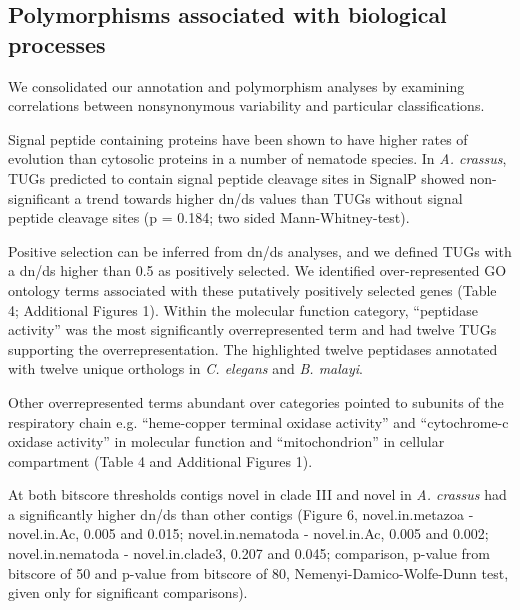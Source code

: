 \documentclass[10pt]{bmc_article}
\newenvironment{bmcformat}{\begin{raggedright}\baselineskip20pt\sloppy\setboolean{publ}{false}}{\end{raggedright}\baselineskip20pt\sloppy}
\begin{document}
\begin{bmcformat}
\subsection*{Polymorphisms associated with biological processes}

We consolidated our annotation and polymorphism analyses by examining
correlations between nonsynonymous variability and particular
classifications.

Signal peptide containing proteins have been shown to have higher
rates of evolution than cytosolic proteins in a number of nematode
species. In \textit{A. crassus}, TUGs predicted to contain signal
peptide cleavage sites in SignalP showed non-significant a trend
towards higher dn/ds values than TUGs without signal peptide cleavage
sites (p = 0.184; two sided
Mann-Whitney-test).

Positive selection can be inferred from dn/ds analyses, and we defined
TUGs with a dn/ds higher than 0.5 as positively selected. We
identified over-represented GO ontology terms associated with these
putatively positively selected genes (Table 4; Additional Figures
1). Within the molecular function category, ``peptidase activity'' was
the most significantly overrepresented term and had twelve TUGs
supporting the overrepresentation. The highlighted twelve peptidases
annotated with twelve unique orthologs in \textit{C. elegans} and
\textit{B. malayi}.



Other overrepresented terms abundant over categories pointed to
subunits of the respiratory chain e.g. ``heme-copper terminal oxidase
activity'' and ``cytochrome-c oxidase activity'' in molecular function
and ``mitochondrion'' in cellular compartment (Table 4 and Additional
Figures 1).

At both bitscore thresholds contigs novel in clade III and novel in
\textit{A. crassus} had a significantly higher dn/ds than other
contigs (Figure 6, novel.in.metazoa - novel.in.Ac, 0.005 and 0.015;
novel.in.nematoda - novel.in.Ac, 0.005 and 0.002; novel.in.nematoda -
novel.in.clade3, 0.207 and 0.045; comparison, p-value from bitscore of
50 and p-value from bitscore of 80, Nemenyi-Damico-Wolfe-Dunn test,
given only for significant comparisons).


\end{bmcformat}
\end{document}
